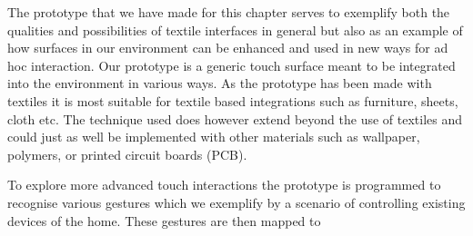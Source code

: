 The prototype that we have made for this chapter serves to exemplify both the qualities and possibilities of textile interfaces in general but also as an example of how surfaces in our environment can be enhanced and used in new ways for ad hoc interaction.
Our prototype is a generic touch surface meant to be integrated into the environment in various ways.
As the prototype has been made with textiles it is most suitable for textile based integrations such as furniture, sheets, cloth etc.
The technique used does however extend beyond the use of textiles and could just as well be implemented with other materials such as wallpaper, polymers, or printed circuit boards (PCB).

To explore more advanced touch interactions the prototype is programmed to recognise various gestures which we exemplify by a scenario of controlling existing devices of the home.
These gestures are then mapped to 

